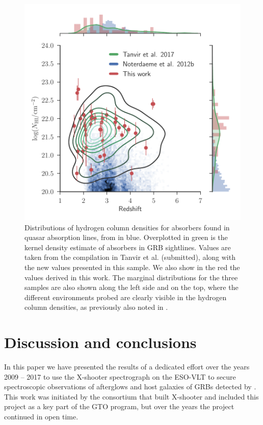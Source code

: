 \documentclass[longauth]{aa}    %
\begin{document}
\begin{figure}[!t]
	\centering \includegraphics[width=\columnwidth]{figures/NH_dist.pdf}
\caption{Distributions of hydrogen column densities for absorbers found in
	quasar absorption lines, from \citet{Noterdaeme2012b} in blue. Overplotted in
	green is the kernel density estimate of absorbers in GRB sightlines. Values are
	taken from the compilation in Tanvir et al. (submitted), along with the new
	values presented in this sample. We also show in the red the values derived in
	this work. The marginal distributions for the three samples are also shown
	along the left side and on the top, where the different environments probed are
	clearly visible in the hydrogen column densities, as previously also noted in
	\citet{Fynbo2009}.} \label{fig:NH_dist}
\end{figure}



\section{Discussion and conclusions}\label{conclusions}

In this paper we have presented the results of a dedicated effort over the years
2009 -- 2017 to use the X-shooter spectrograph on the ESO-VLT to secure
spectroscopic observations of afterglows and host galaxies of GRBs detected by
\swift. This work was initiated by the consortium that built X-shooter and
included this project as a key part of the GTO program, but over the years the
project continued in open time.
\end{document}
